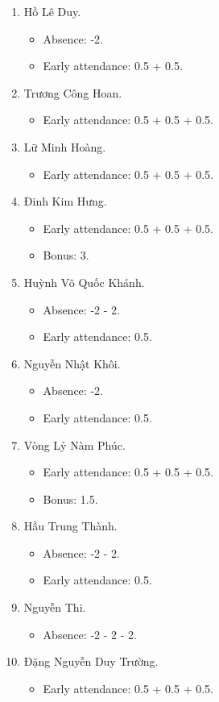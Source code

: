 \documentclass{article}
\begin{document}
\begin{enumerate}
	\item {\sc Hồ Lê Duy.}
	\begin{itemize}
		\item Absence: -2.
		\item Early attendance: 0.5 + 0.5.
	\end{itemize}
	\item {\sc Trương Công Hoan.}
	\begin{itemize}
		\item Early attendance: 0.5 + 0.5 + 0.5.
	\end{itemize}
	\item {\sc Lữ Minh Hoàng.}
	\begin{itemize}
		\item Early attendance: 0.5 + 0.5 + 0.5.
	\end{itemize}
	\item {\sc Đinh Kim Hưng.}
	\begin{itemize}
		\item Early attendance: 0.5 + 0.5 + 0.5.
		\item Bonus: 3.
	\end{itemize}
	\item {\sc Huỳnh Võ Quốc Khánh.}
	\begin{itemize}
		\item Absence: -2 - 2.
		\item Early attendance: 0.5.
	\end{itemize}
	\item {\sc Nguyễn Nhật Khôi.}
	\begin{itemize}
		\item Absence: -2.
		\item Early attendance: 0.5.
	\end{itemize}
	\item {\sc Vòng Lỷ Nàm Phúc.}
	\begin{itemize}
		\item Early attendance: 0.5 + 0.5 + 0.5.
		\item Bonus: 1.5.
	\end{itemize}
	\item {\sc Hầu Trung Thành.}
	\begin{itemize}
		\item Absence: -2 - 2.
		\item Early attendance: 0.5.
	\end{itemize}
	\item {\sc Nguyễn Thi.}
	\begin{itemize}
		\item Absence: -2 - 2 - 2.
	\end{itemize}
	\item {\sc Đặng Nguyễn Duy Trường.}
	\begin{itemize}
		\item Early attendance: 0.5 + 0.5 + 0.5.
	\end{itemize}
\end{enumerate}
\end{document}
